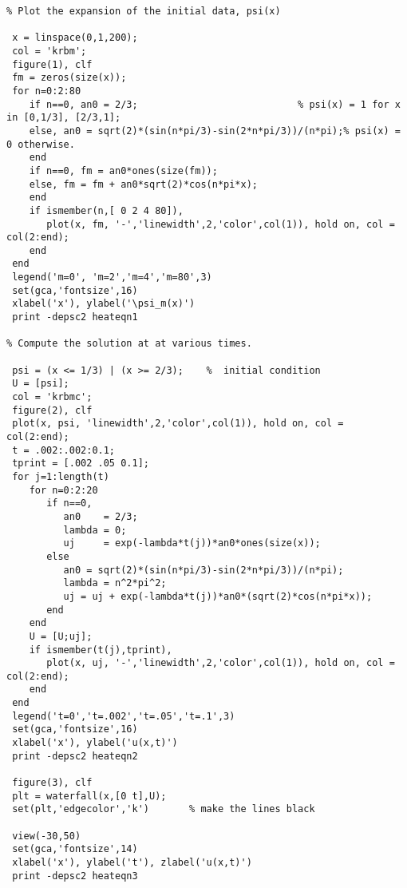 {\footnotesize \begin{verbatim}
% Plot the expansion of the initial data, psi(x)

 x = linspace(0,1,200);
 col = 'krbm';
 figure(1), clf
 fm = zeros(size(x));
 for n=0:2:80
    if n==0, an0 = 2/3;                            % psi(x) = 1 for x in [0,1/3], [2/3,1]; 
    else, an0 = sqrt(2)*(sin(n*pi/3)-sin(2*n*pi/3))/(n*pi);% psi(x) = 0 otherwise. 
    end
    if n==0, fm = an0*ones(size(fm));
    else, fm = fm + an0*sqrt(2)*cos(n*pi*x);
    end
    if ismember(n,[ 0 2 4 80]), 
       plot(x, fm, '-','linewidth',2,'color',col(1)), hold on, col = col(2:end);
    end
 end 
 legend('m=0', 'm=2','m=4','m=80',3)
 set(gca,'fontsize',16)
 xlabel('x'), ylabel('\psi_m(x)')
 print -depsc2 heateqn1 

% Compute the solution at at various times.

 psi = (x <= 1/3) | (x >= 2/3);    %  initial condition
 U = [psi];
 col = 'krbmc';
 figure(2), clf
 plot(x, psi, 'linewidth',2,'color',col(1)), hold on, col = col(2:end);
 t = .002:.002:0.1;
 tprint = [.002 .05 0.1];
 for j=1:length(t)
    for n=0:2:20
       if n==0, 
          an0    = 2/3;
          lambda = 0;
          uj     = exp(-lambda*t(j))*an0*ones(size(x)); 
       else
          an0 = sqrt(2)*(sin(n*pi/3)-sin(2*n*pi/3))/(n*pi);
          lambda = n^2*pi^2;
          uj = uj + exp(-lambda*t(j))*an0*(sqrt(2)*cos(n*pi*x));
       end
    end 
    U = [U;uj];
    if ismember(t(j),tprint), 
       plot(x, uj, '-','linewidth',2,'color',col(1)), hold on, col = col(2:end);
    end
 end
 legend('t=0','t=.002','t=.05','t=.1',3)
 set(gca,'fontsize',16)
 xlabel('x'), ylabel('u(x,t)')
 print -depsc2 heateqn2 

 figure(3), clf
 plt = waterfall(x,[0 t],U);
 set(plt,'edgecolor','k')       % make the lines black

 view(-30,50)
 set(gca,'fontsize',14)
 xlabel('x'), ylabel('t'), zlabel('u(x,t)')
 print -depsc2 heateqn3

\end{verbatim}}
